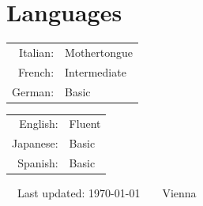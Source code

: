 \documentclass[11pt]{article} %
\begin{document}
\section*{Languages}

\begin{minipage}[t]{.45\textwidth}
\begin{tabular}{rl}
Italian: & Mothertongue\\
French: & Intermediate\\
German: & Basic\\
\end{tabular}
\end{minipage}%
\begin{minipage}[t]{.45\textwidth}
\begin{tabular}{rl}
English: & Fluent\\
Japanese: & Basic\\
Spanish: & Basic\\
\end{tabular}
\end{minipage}


\begin{center}
	\scriptsize
	\raisebox{-0.5pt}{\textbullet}~~Last updated: \today~~\raisebox{-0.5pt}{\textbullet}~~Vienna~~\raisebox{-0.5pt}{\textbullet}
\end{center}
\end{document}
